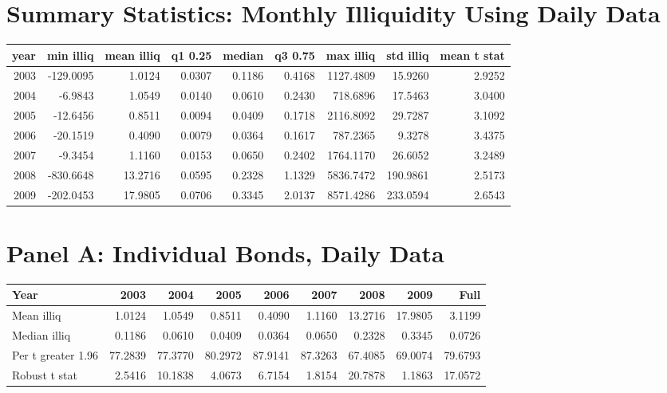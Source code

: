 \documentclass{article}
\begin{document}
\section*{Summary Statistics: Monthly Illiquidity Using Daily Data}
\begin{center}
\begin{tabular}{rrrrrrrrr}
\toprule
year & min illiq & mean illiq & q1 0.25 & median & q3 0.75 & max illiq & std illiq & mean t stat \\
\midrule
2003 & -129.0095 & 1.0124 & 0.0307 & 0.1186 & 0.4168 & 1127.4809 & 15.9260 & 2.9252 \\
2004 & -6.9843 & 1.0549 & 0.0140 & 0.0610 & 0.2430 & 718.6896 & 17.5463 & 3.0400 \\
2005 & -12.6456 & 0.8511 & 0.0094 & 0.0409 & 0.1718 & 2116.8092 & 29.7287 & 3.1092 \\
2006 & -20.1519 & 0.4090 & 0.0079 & 0.0364 & 0.1617 & 787.2365 & 9.3278 & 3.4375 \\
2007 & -9.3454 & 1.1160 & 0.0153 & 0.0650 & 0.2402 & 1764.1170 & 26.6052 & 3.2489 \\
2008 & -830.6648 & 13.2716 & 0.0595 & 0.2328 & 1.1329 & 5836.7472 & 190.9861 & 2.5173 \\
2009 & -202.0453 & 17.9805 & 0.0706 & 0.3345 & 2.0137 & 8571.4286 & 233.0594 & 2.6543 \\
\bottomrule
\end{tabular}

\end{center}

\section*{Panel A: Individual Bonds, Daily Data}
\begin{center}
\begin{tabular}{l|rrrrrrrr}
\toprule
Year & 2003 & 2004 & 2005 & 2006 & 2007 & 2008 & 2009 & Full \\
\midrule
Mean illiq & 1.0124 & 1.0549 & 0.8511 & 0.4090 & 1.1160 & 13.2716 & 17.9805 & 3.1199 \\
Median illiq & 0.1186 & 0.0610 & 0.0409 & 0.0364 & 0.0650 & 0.2328 & 0.3345 & 0.0726 \\
Per t greater 1.96 & 77.2839 & 77.3770 & 80.2972 & 87.9141 & 87.3263 & 67.4085 & 69.0074 & 79.6793 \\
Robust t stat & 2.5416 & 10.1838 & 4.0673 & 6.7154 & 1.8154 & 20.7878 & 1.1863 & 17.0572 \\
\bottomrule
\end{tabular}

\end{center}
\end{document}
